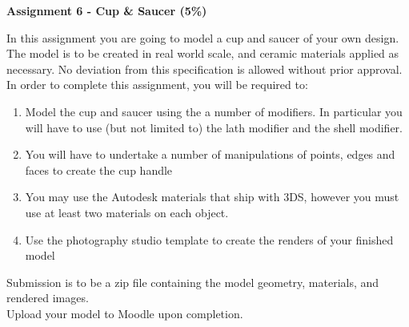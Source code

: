 
	
\begin{flushleft}
\Large\textbf{Assignment 6 - Cup \& Saucer (5\%)}\\
\end{flushleft}

In this assignment you are going to model a cup and saucer of your own design.  The model is to be created in real world scale, and ceramic materials applied as necessary.  No deviation from this specification is allowed without prior approval.  In order to complete this assignment, you will be required to:
\begin{enumerate}
	\item Model the cup and saucer using the a number of modifiers.  In particular you will have to use (but not limited to) the lath modifier and the shell modifier.
	\item You will have to undertake a number of manipulations of points, edges and faces to create the cup handle
	\item You may use the Autodesk materials that ship with 3DS, however you must use at least two materials on each object.
	\item Use the photography studio template to create the renders of your finished model
\end{enumerate}

Submission is to be a zip file containing the model geometry, materials, and rendered images.\\

Upload your model to Moodle upon completion.

